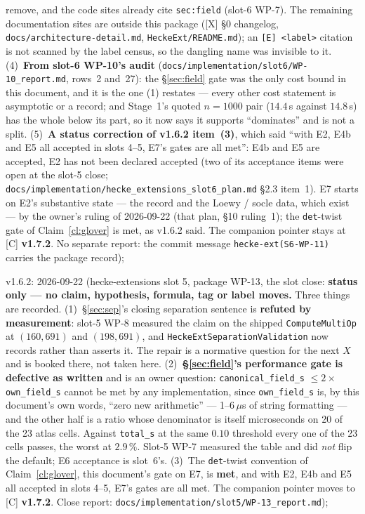 \documentclass[11pt]{article}
\theoremstyle{remark}
\begin{document}
remove, and the code sites already cite \texttt{sec:field} (slot-6 WP-7). The remaining
documentation sites are outside this package ([X] \S0 changelog, \texttt{docs/architecture-detail.md},
\texttt{HeckeExt/README.md}); an \texttt{[E]~<label>} citation is not scanned by the label census,
so the dangling name was invisible to it.
(4)~\textbf{From slot-6 WP-10's audit} (\texttt{docs/implementation/slot6/WP-10\_report.md},
rows~2 and~27): the \S\ref{sec:field} gate was the only cost bound in this document, and it is
the one (1) restates --- every other cost statement is asymptotic or a record; and Stage~1's
quoted $n=1000$ pair ($14.4$\,s against $14.8$\,s) has the whole below its part, so it now says
it supports ``dominates'' and is not a split.
(5)~\textbf{A status correction of v1.6.2 item~(3)}, which said ``with E2, E4b and E5 all
accepted in slots 4--5, E7's gates are all met'': E4b and E5 are accepted, E2 has not been
declared accepted (two of its acceptance items were open at the slot-5 close;
\texttt{docs/implementation/hecke\_extensions\_slot6\_plan.md} \S2.3 item~1). E7 starts on E2's
substantive state --- the record and the Loewy / socle data, which exist --- by the owner's
ruling of 2026-09-22 (that plan, \S10 ruling~1); the \texttt{det}-twist gate of
Claim~\ref{cl:glover} is met, as v1.6.2 said. The companion pointer stays at [C]
\textbf{v1.7.2}. No separate report: the commit message \texttt{hecke-ext(S6-WP-11)} carries the package record);

v1.6.2: 2026-09-22 (hecke-extensions slot 5, package WP-13, the slot close:
\textbf{status only --- no claim, hypothesis, formula, tag or label moves.} Three things are
recorded. (1)~\S\ref{sec:sep}'s closing separation sentence is \textbf{refuted by
measurement}: slot-5 WP-8 measured the claim on the shipped \texttt{ComputeMultiOp} at
$(160,691)$ and $(198,691)$, and \texttt{HeckeExtSeparationValidation} now records rather than
asserts it. The repair is a normative question for the next $X$ and is booked there, not taken
here. (2)~\textbf{\S\ref{sec:field}'s performance gate is defective as written} and is an
owner question: \texttt{canonical\_field\_s} $\le 2\times$ \texttt{own\_field\_s} cannot be met
by any implementation, since \texttt{own\_field\_s} is, by this document's own words, ``zero new
arithmetic'' --- 1--6\,$\mu$s of string formatting --- and the other half is a ratio whose
denominator is itself microseconds on 20 of the 23 atlas cells. Against \texttt{total\_s} at the
same $0.10$ threshold every one of the 23 cells passes, the worst at $2.9\,\%$. Slot-5 WP-7
measured the table and did \emph{not} flip the default; E6 acceptance is slot~6's. (3)~The
\texttt{det}-twist convention of Claim~\ref{cl:glover}, this document's gate on E7, is
\textbf{met}, and with E2, E4b and E5 all accepted in slots 4--5, E7's gates are all met. The
companion pointer moves to [C] \textbf{v1.7.2}. Close report:
\texttt{docs/implementation/slot5/WP-13\_report.md});
\end{document}
